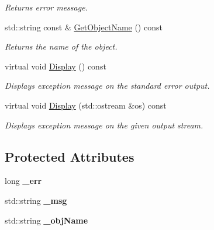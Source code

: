 \begin{DoxyCompactItemize}
\begin{DoxyCompactList}\small\item\em Returns error message. \end{DoxyCompactList}\item 
\hypertarget{class_common_1_1_exception_af8360d82fa52fb0ed9b3d60c8896f59e}{std\-::string const \& \hyperlink{class_common_1_1_exception_af8360d82fa52fb0ed9b3d60c8896f59e}{Get\-Object\-Name} () const }\label{class_common_1_1_exception_af8360d82fa52fb0ed9b3d60c8896f59e}

\begin{DoxyCompactList}\small\item\em Returns the name of the object. \end{DoxyCompactList}\item 
\hypertarget{class_common_1_1_exception_aedcfae1f86e9f5496c33ba4e6db883c2}{virtual void \hyperlink{class_common_1_1_exception_aedcfae1f86e9f5496c33ba4e6db883c2}{Display} () const }\label{class_common_1_1_exception_aedcfae1f86e9f5496c33ba4e6db883c2}

\begin{DoxyCompactList}\small\item\em Displays exception message on the standard error output. \end{DoxyCompactList}\item 
virtual void \hyperlink{class_common_1_1_exception_a2633eeaab3220268739977a04643a3cf}{Display} (std\-::ostream \&os) const 
\begin{DoxyCompactList}\small\item\em Displays exception message on the given output stream. \end{DoxyCompactList}\end{DoxyCompactItemize}
\subsection*{Protected Attributes}
\begin{DoxyCompactItemize}
\item 
\hypertarget{class_common_1_1_exception_a44c14e8761e67333733ff2b2496711e5}{long {\bfseries \-\_\-err}}\label{class_common_1_1_exception_a44c14e8761e67333733ff2b2496711e5}

\item 
\hypertarget{class_common_1_1_exception_a410fa237f76aae7a455f60d0e2441de2}{std\-::string {\bfseries \-\_\-msg}}\label{class_common_1_1_exception_a410fa237f76aae7a455f60d0e2441de2}

\item 
\hypertarget{class_common_1_1_exception_a3332fee5e92d992e80d28472107e7775}{std\-::string {\bfseries \-\_\-obj\-Name}}\label{class_common_1_1_exception_a3332fee5e92d992e80d28472107e7775}

\end{DoxyCompactItemize}


